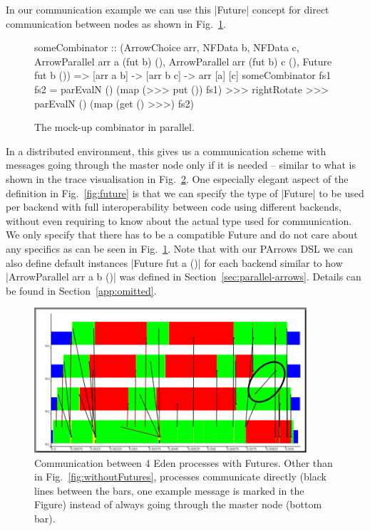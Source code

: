 In our communication example we can use this |Future| concept for direct communication between nodes as shown in Fig.~\ref{fig:someCombinatorParallel}.
\begin{figure}[tbh]
\begin{code}
someCombinator :: (ArrowChoice arr, NFData b, NFData c,
	ArrowParallel arr a (fut b) (), 
	ArrowParallel arr (fut b) c (),
	Future fut b ()) =>
	[arr a b] -> [arr b c] -> arr [a] [c]
someCombinator fs1 fs2 =
	parEvalN () (map (>>> put ()) fs1) >>>
	rightRotate >>>
	parEvalN () (map (get () >>>) fs2)
\end{code}
\caption{The mock-up combinator in parallel.}
\label{fig:someCombinatorParallel}
\end{figure}
In a distributed environment, this gives us a communication scheme with messages going through the master node only if it is needed -- similar to what is shown in the trace visualisation in Fig.~\ref{fig:withFutures}. One especially elegant aspect of the definition in Fig.~\ref{fig:future} is that we can specify the type of |Future| to be used per backend with full interoperability between code using different backends, without even requiring to know about the actual type used for communication. We only specify that there has to be a compatible Future and do not care about any specifics as can be seen in Fig.~\ref{fig:someCombinatorParallel}. Note that with our PArrows DSL we can also define default instances |Future fut a ()| for each backend similar to how |ArrowParallel arr a b ()| was defined in Section~\ref{sec:parallel-arrows}. Details can be found in Section~\ref{app:omitted}. 
\begin{figure}[ht]
	\centering
	\includegraphics[width=0.9\textwidth]{images/withFutures}
	\caption[with Futures]{Communication between 4 Eden processes with Futures. Other than in Fig.~\ref{fig:withoutFutures}, processes communicate directly (black lines between the bars, one example message is marked in the Figure) instead of always going through the master node (bottom bar).}
	\label{fig:withFutures}
\end{figure}
